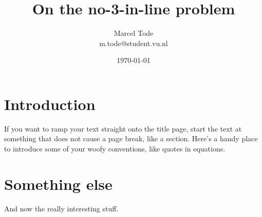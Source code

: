 \documentclass[notitlepage]{article}
\title{On the no-3-in-line problem}
\author{Marcel Tode \\ m.tode@student.vu.nl}
\date{\today}
\begin{document}
\maketitle
\thispagestyle{empty}

\begin{abstract}
  \lipsum[1]
\end{abstract}

\section*{Introduction}
If you want to ramp your text straight onto the title page, start the text at
something that does not cause a page break, like a section.  Here's a handy
place to introduce some of your woofy conventions, like quotes in equations.

\section*{Something else}
And now the really interesting stuff.
\end{document}
